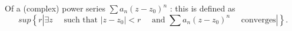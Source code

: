 Of a (complex) power series  $  \sum a_n(z-z_0)^n $ : this is
defined as  \[ sup \left \{ r   \left |    \exists z  
\quad \text{ such that } |z-z_0|<r
\quad \text{ and }  \sum a_n(z-z_0)^n \quad \text{ converges} \right | \right \} . \]